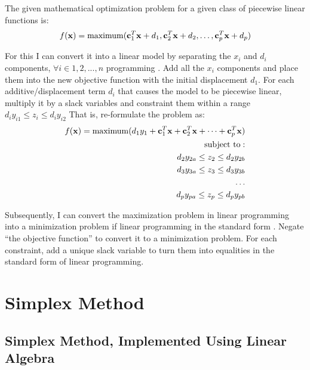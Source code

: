 \documentclass[letter,12pt]{article}
\begin{document}
The given mathematical optimization problem for a given class of piecewise linear functions is:
\begin{eqnarray*}
f({\mathbf{x}}) = {\rm maximum} (\mathbf{c}^{T}_{1}\mathbf{x} + d_{1}, \mathbf{c}^{T}_{2}\mathbf{x} + d_{2}, \dots, \mathbf{c}^{T}_{p}\mathbf{x} + d_{p})
\end{eqnarray*}

For this I can convert it into a linear model by separating the $x_{i}$ and $d_{i}$ components, $\forall i \in {1, 2, ..., n}$
programming \cite[\S3.3, pages 83--86]{Haftka1992}\cite[\S1, pages 5-8]{Malucelli2005}. Add all the $x_{i}$ components and place them into the new objective function with the initial displacement $d_{1}$. For each additive/displacement term $d_{i}$ that causes the model to be piecewise linear, multiply it by a slack variables and constraint them within a range $d_{i}y_{i1} \leq z_{i} \leq d_{i}y_{i2}$ That is, re-formulate the problem as:
\begin{eqnarray*}
f({\mathbf{x}}) = {\rm maximum} (d_{1}y_{1} + \mathbf{c}^{T}_{1}\mathbf{x} + \mathbf{c}^{T}_{2}\mathbf{x} + \dots + \mathbf{c}^{T}_{p}\mathbf{x}) \\
{\rm subject\ to:} \\
d_{2}y_{2a} \leq z_{2} \leq d_{2}y_{2b} \\
d_{3}y_{3a} \leq z_{3} \leq d_{3}y_{3b} \\
\dots \\
d_{p}y_{pa} \leq z_{p} \leq d_{p}y_{pb} \\
\end{eqnarray*}


Subsequently, I can convert the maximization problem in linear programming into a minimization problem if linear programming in the standard form \cite[\S3.4, page 48, Example 1]{Luenberger2008}. Negate ``the objective function'' to convert it to a minimization problem. For each constraint, add a unique slack variable to turn them into equalities in the standard form of linear programming.

\section{Simplex Method}
\label{ssec:simplexmethod}



\subsection{Simplex Method, Implemented Using Linear Algebra}
\label{ssec:simplexmethodlinearalgebra}
\end{document}
